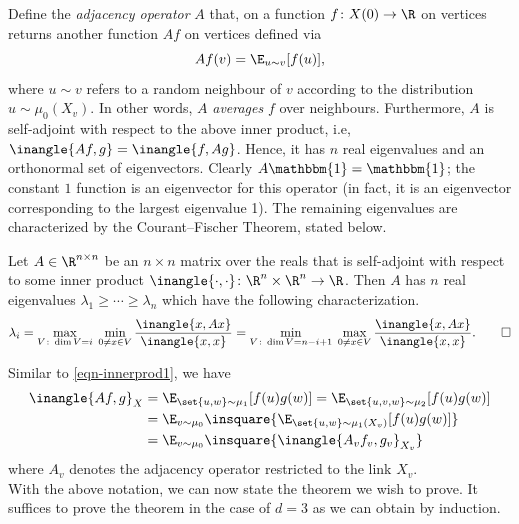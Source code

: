 \documentclass{toc}
\begin{document}
Define the \emph{adjacency operator} $A$ that, on a function $f\colon X(0) \rightarrow \R$ on vertices returns another function $Af$ on vertices defined via
\[
  Af(v) = \E_{u\sim v}[f(u)],
\]
where $u\sim v$ refers to a random neighbour of $v$ according to the distribution $u \sim \mu_0(X_v)$.
In other words, $A$ \emph{averages} $f$ over neighbours. Furthermore,
$A$ is self-adjoint with respect to the above inner product, i.e,
$\inangle{Af,g} = \inangle{f,Ag}$. Hence, it has $n$ real eigenvalues
and an orthonormal set of eigenvectors. Clearly
$A\mathbbm{1} = \mathbbm{1}$; the constant $1$ function is an
eigenvector for this operator (in fact, it is an eigenvector
corresponding to the largest eigenvalue 1). The remaining eigenvalues
are characterized by the %
Courant--Fischer Theorem, stated below.  %

%
\begin{theorem}  \label{thm:cf1}  %
  Let $A\in \R^{n \times n}$ be an $n \times n$ matrix over the reals
  that is self-adjoint with respect to some inner product
  $\inangle{\cdot , \cdot }\colon \R^n \times \R^n \to \R$. Then $A$ has $n$ real
  eigenvalues $\lambda_1 \geq \cdots \geq \lambda_n$ which have the
  following characterization.
  \[
    \lambda_i = \max_{V \colon \dim V = i}\; \min_{0\neq  x \in V}
    \frac{\inangle{x,Ax}}{\inangle{x,x}} =  \min_{V \colon \dim V = n-i+1}\; \max_{ 0\neq x \in V}
    \frac{\inangle{x,Ax}}{\inangle{x,x}}.\qedhere
  \]
%
\end{theorem}       %
    


Similar to \eqref{eqn-innerprod1}, we have
\begin{align}
  \inangle{Af,g}_X & = \E_{\set{u,w} \sim \mu_1} [f(u) g(w)] = \E_{\set{u,v,w} \sim \mu_2} [f(u) g(w)]\nonumber\\
                 & = \E_{v \sim \mu_0}\insquare{\E_{\set{u,w}\sim  \mu_1(X_v)} [f(u) g(w)]}\nonumber\\
                 & = \E_{v \sim \mu_0}\insquare{\inangle{A_v f_v,g_v}_{X_v}}\label{eqn-innerprod2}
\end{align}
where $A_v$ denotes the adjacency operator restricted to the link $X_v$. \\

With the above notation, we can now state the theorem we wish to prove.
It suffices to prove the theorem in the case of $d = 3$ as we can obtain 
 by induction.
\end{document}

